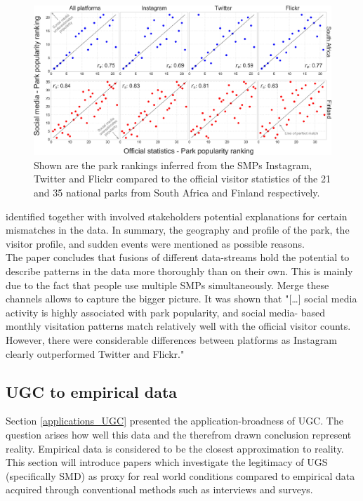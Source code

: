 \begin{figure}[h]
   \centering
   \includegraphics[width=\textwidth]{img/tenkanen_2017_SMPs.pdf}
   \caption{Shown are the park rankings inferred from the SMPs Instagram, Twitter and Flickr compared to the official visitor statistics of the 21 and 35 national parks from South Africa and Finland respectively.}
   \label{fig:tenkanen_SMP}
\end{figure}

\textcite{Tenkanen2017} identified together with involved stakeholders potential explanations for certain mismatches in the data. In summary, the geography and profile of the park, the visitor profile, and sudden events were mentioned as possible reasons.\\
The paper concludes that fusions of different data-streams hold the potential to describe patterns in the data more thoroughly than on their own. This is mainly due to the fact that people use multiple SMPs simultaneously. Merge these channels allows to capture the bigger picture.
It was shown that "[\dots] social media activity is highly associated with park popularity, and social media- based monthly visitation patterns match relatively well with the official visitor counts. However, there were considerable differences between platforms as Instagram clearly outperformed Twitter and Flickr."\parencite{Tenkanen2017}

\subsection{UGC to empirical data} \label{ugc_vs_empirical}
Section \ref{applications_UGC} presented the application-broadness of UGC. The question arises how well this data and the therefrom drawn conclusion represent reality. Empirical data is considered to be the closest approximation to reality. This section will introduce papers which investigate the legitimacy of UGS (specifically SMD) as proxy for real world conditions compared to empirical data acquired through conventional methods such as interviews and surveys.

